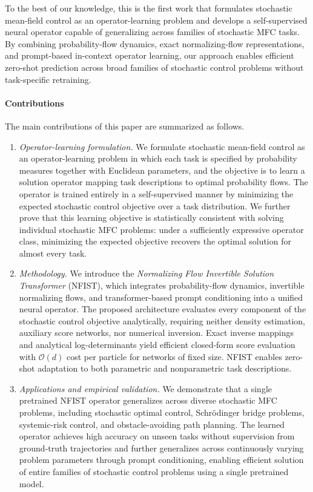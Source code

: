 \documentclass[preprint]{elsarticle}
\begin{document}
To the best of our knowledge, this is the first work that formulates stochastic mean-field control as an operator-learning problem and develops a self-supervised neural operator capable of generalizing across families of stochastic MFC tasks. By combining probability-flow dynamics, exact normalizing-flow representations, and prompt-based in-context operator learning, our approach enables efficient zero-shot prediction across broad families of stochastic control problems without task-specific retraining.

\paragraph{Contributions} The main contributions of this paper are summarized as follows.

\begin{enumerate}
    \item \emph{Operator-learning formulation.} We formulate stochastic mean-field control as an operator-learning problem in which each task is specified by probability measures together with Euclidean parameters, and the objective is to learn a solution operator mapping task descriptions to optimal probability flows. The operator is trained entirely in a self-supervised manner by minimizing the expected stochastic control objective over a task distribution. We further prove that this learning objective is statistically consistent with solving individual stochastic MFC problems: under a sufficiently expressive operator class, minimizing the expected objective recovers the optimal solution for almost every task.

    \item \emph{Methodology.} We introduce the \emph{Normalizing Flow Invertible Solution Transformer} (NFIST), which integrates probability-flow dynamics, invertible normalizing flows, and transformer-based prompt conditioning into a unified neural operator. The proposed architecture evaluates every component of the stochastic control objective analytically, requiring neither density estimation, auxiliary score networks, nor numerical inversion. Exact inverse mappings and analytical log-determinants yield efficient closed-form score evaluation with $\mathcal{O}(d)$ cost per particle for networks of fixed size. NFIST enables zero-shot adaptation to both parametric and nonparametric task descriptions.

    \item \emph{Applications and empirical validation.} We demonstrate that a single pretrained NFIST operator generalizes across diverse stochastic MFC problems, including stochastic optimal control, Schr\"odinger bridge problems, systemic-risk control, and obstacle-avoiding path planning. The learned operator achieves high accuracy on unseen tasks without supervision from ground-truth trajectories and further generalizes across continuously varying problem parameters through prompt conditioning, enabling efficient solution of entire families of stochastic control problems using a single pretrained model.
\end{enumerate}
\end{document}
